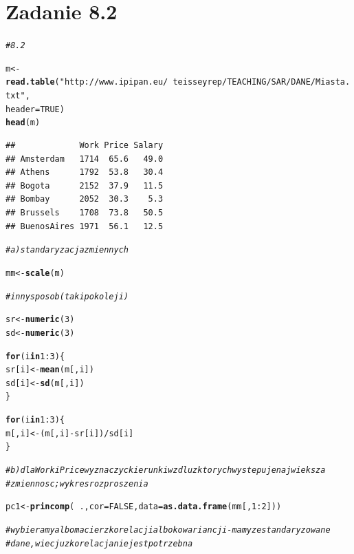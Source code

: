 \documentclass[10pt]{article}\usepackage[]{graphicx}\usepackage[]{color}
\makeatletter
\newcommand{\hlnum}[1]{\textcolor[rgb]{0.686,0.059,0.569}{#1}}%
\newcommand{\hlstr}[1]{\textcolor[rgb]{0.192,0.494,0.8}{#1}}%
\newcommand{\hlcom}[1]{\textcolor[rgb]{0.678,0.584,0.686}{\textit{#1}}}%
\newcommand{\hlopt}[1]{\textcolor[rgb]{0,0,0}{#1}}%
\newcommand{\hlstd}[1]{\textcolor[rgb]{0.345,0.345,0.345}{#1}}%
\newcommand{\hlkwa}[1]{\textcolor[rgb]{0.161,0.373,0.58}{\textbf{#1}}}%
\newcommand{\hlkwb}[1]{\textcolor[rgb]{0.69,0.353,0.396}{#1}}%
\newcommand{\hlkwc}[1]{\textcolor[rgb]{0.333,0.667,0.333}{#1}}%
\newcommand{\hlkwd}[1]{\textcolor[rgb]{0.737,0.353,0.396}{\textbf{#1}}}%
\newenvironment{kframe}{%
 \def\at@end@of@kframe{}%
 \ifinner\ifhmode%
  \def\at@end@of@kframe{\end{minipage}}%
  \begin{minipage}{\columnwidth}%
 \fi\fi%
 \def\FrameCommand##1{\hskip\@totalleftmargin \hskip-\fboxsep
 \colorbox{shadecolor}{##1}\hskip-\fboxsep
     \hskip-\linewidth \hskip-\@totalleftmargin \hskip\columnwidth}%
 \MakeFramed {\advance\hsize-\width
   \@totalleftmargin\z@ \linewidth\hsize
   \@setminipage}}%
 {\par\unskip\endMakeFramed%
 \at@end@of@kframe}
\newenvironment{knitrout}{}{} %
\makeatother
\begin{document}
\section{Zadanie 8.2}

\begin{knitrout}
\color{fgcolor}\begin{kframe}
\begin{alltt}
\hlcom{# 8.2}

\hlstd{m} \hlkwb{<-} \hlkwd{read.table}\hlstd{(}\hlstr{"http://www.ipipan.eu/~teisseyrep/TEACHING/SAR/DANE/Miasta.txt"}\hlstd{,}
    \hlkwc{header} \hlstd{=} \hlnum{TRUE}\hlstd{)}
\hlkwd{head}\hlstd{(m)}
\end{alltt}
\begin{verbatim}
##             Work Price Salary
## Amsterdam   1714  65.6   49.0
## Athens      1792  53.8   30.4
## Bogota      2152  37.9   11.5
## Bombay      2052  30.3    5.3
## Brussels    1708  73.8   50.5
## BuenosAires 1971  56.1   12.5
\end{verbatim}
\begin{alltt}
\hlcom{# a) standaryzacja zmiennych}

\hlstd{mm} \hlkwb{<-} \hlkwd{scale}\hlstd{(m)}

\hlcom{# inny sposob (taki po koleji)}

\hlstd{sr} \hlkwb{<-} \hlkwd{numeric}\hlstd{(}\hlnum{3}\hlstd{)}
\hlstd{sd} \hlkwb{<-} \hlkwd{numeric}\hlstd{(}\hlnum{3}\hlstd{)}

\hlkwa{for} \hlstd{(i} \hlkwa{in} \hlnum{1}\hlopt{:}\hlnum{3}\hlstd{) \{}
    \hlstd{sr[i]} \hlkwb{<-} \hlkwd{mean}\hlstd{(m[, i])}
    \hlstd{sd[i]} \hlkwb{<-} \hlkwd{sd}\hlstd{(m[, i])}
\hlstd{\}}

\hlkwa{for} \hlstd{(i} \hlkwa{in} \hlnum{1}\hlopt{:}\hlnum{3}\hlstd{) \{}
    \hlstd{m[, i]} \hlkwb{<-} \hlstd{(m[, i]} \hlopt{-} \hlstd{sr[i])}\hlopt{/}\hlstd{sd[i]}
\hlstd{\}}

\hlcom{# b) dla Work i Price wyznaczyc kierunki wzdluz ktorych wystepuje najwieksza}
\hlcom{# zmiennosc; wykres rozproszenia}

\hlstd{pc1} \hlkwb{<-} \hlkwd{princomp}\hlstd{(}\hlopt{~}\hlstd{.,} \hlkwc{cor} \hlstd{=} \hlnum{FALSE}\hlstd{,} \hlkwc{data} \hlstd{=} \hlkwd{as.data.frame}\hlstd{(mm[,} \hlnum{1}\hlopt{:}\hlnum{2}\hlstd{]))}

\hlcom{# wybieramy albo macierz korelacji albo kowariancji - mamy zestandaryzowane}
\hlcom{# dane, wiec juz korelacja nie jest potrzebna}


\end{alltt}
\end{kframe}
\end{knitrout}
\end{document}
